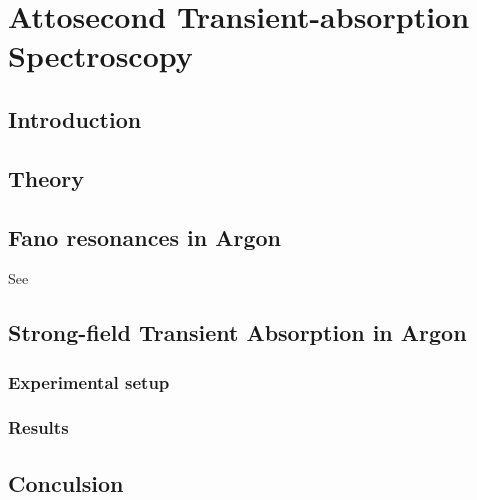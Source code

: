 \chapter{Attosecond Transient-absorption Spectroscopy}
\label{chap:ATS}

\section{Introduction}
\label{sec:intro_ats}

\section{Theory}
\label{sec:ats_theory}

\section{Fano resonances in Argon}
\label{sec:fano_ar}

See \cite{caretteMulticonfigurationalHartreeFockClosecoupling2013}

\section{Strong-field Transient Absorption in Argon}
\label{sec:ATS_ar}

\subsection{Experimental setup}
\label{sec:ATS_ar_exp_setup}

\subsection{Results}
\label{sec:ATS_ar_results}

\section{Conculsion}
\label{sec:ATS_conclusion}

